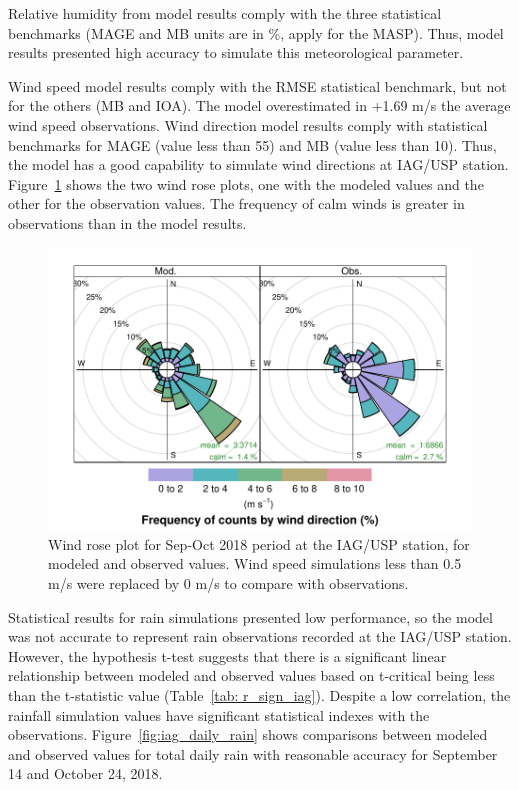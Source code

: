 Relative humidity from model results comply with the three statistical benchmarks (MAGE and MB units are in \%, apply for the MASP).
Thus, model results presented high accuracy to simulate this meteorological parameter.

Wind speed model results comply with the RMSE statistical benchmark, but not for the others (MB and IOA).
The model overestimated in +1.69 m/s the average wind speed observations.
Wind direction model results comply with statistical benchmarks for MAGE (value less than 55) and MB (value less than 10).
Thus, the model has a good capability to simulate wind directions at IAG/USP station.
Figure~\ref{fig:wrplot_iag} shows the two wind rose plots, one with the modeled values and the other for the observation values. The frequency of calm winds is greater in observations than in the model results.

\begin{figure}[!hbt]
  \centering
  \includegraphics{fig/WRplot_IAG_sep_oct2018}
  \caption{Wind rose plot for Sep-Oct 2018 period at the IAG/USP station, for modeled and observed values. Wind speed simulations less than 0.5 m/s were replaced by 0 m/s to compare with observations.}
  \label{fig:wrplot_iag}
\end{figure}

Statistical results for rain simulations presented low performance, so the model was not accurate to represent rain observations recorded at the IAG/USP station.
However, the hypothesis t-test suggests that there is a significant linear relationship between modeled and observed values based on t-critical being less than the t-statistic value (Table~\ref{tab: r_sign_iag}).
Despite a low correlation, the rainfall simulation values have significant statistical indexes with the observations. 
Figure~\ref{fig:iag_daily_rain} shows comparisons between modeled and observed values for total daily rain with reasonable accuracy for September 14 and October 24, 2018.


